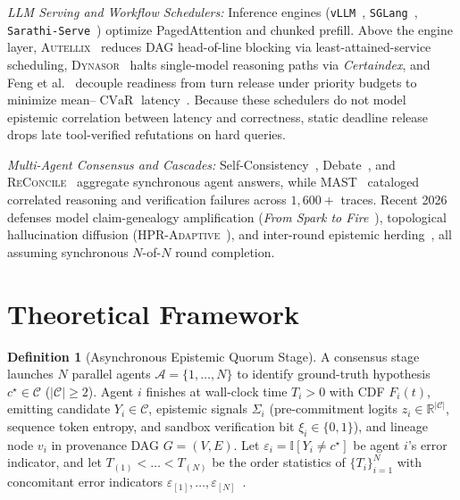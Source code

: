 \documentclass[conference]{IEEEtran}
\theoremstyle{definition}
\newtheorem{definition}{Definition}
\theoremstyle{remark}
\newcommand{\CVaR}{\operatorname{CVaR}}
\newcommand{\R}{\mathbb{R}}
\newcommand{\Ind}{\mathbb{I}}
\begin{document}
\emph{LLM Serving and Workflow Schedulers:} Inference engines (\texttt{vLLM}~\cite{kwon2023vllm}, \texttt{SGLang}~\cite{zheng2024sglang}, \texttt{Sarathi-Serve}~\cite{agrawal2024sarathi}) optimize PagedAttention and chunked prefill. Above the engine layer, \textsc{Autellix}~\cite{luo2025autellix} reduces DAG head-of-line blocking via least-attained-service scheduling, \textsc{Dynasor}~\cite{fu2024dynasor} halts single-model reasoning paths via \emph{Certaindex}, and Feng et al.~\cite{feng2026readiness} decouple readiness from turn release under priority budgets to minimize mean--$\CVaR$ latency~\cite{rockafellar2000cvar}. Because these schedulers do not model epistemic correlation between latency and correctness, static deadline release drops late tool-verified refutations on hard queries.

\emph{Multi-Agent Consensus and Cascades:} Self-Consistency~\cite{wang2023selfconsistency}, Debate~\cite{du2024debate,liang2024divergent}, and \textsc{ReConcile}~\cite{chen2024reconcile} aggregate synchronous agent answers, while \textsc{MAST}~\cite{cemri2025mast} cataloged correlated reasoning and verification failures across $1{,}600+$ traces. Recent 2026 defenses model claim-genealogy amplification (\emph{From Spark to Fire}~\cite{xie2026sparktofire}), topological hallucination diffusion (\textsc{HPR-Adaptive}~\cite{hpr2026collective}), and inter-round epistemic herding~\cite{herding2026cascades}, all assuming synchronous $N$-of-$N$ round completion.

\section{Theoretical Framework}\label{sec:theory}

\begin{definition}[Asynchronous Epistemic Quorum Stage]\label{def:stage}
A consensus stage launches $N$ parallel agents $\mathcal{A} = \{1, \dots, N\}$ to identify ground-truth hypothesis $c^\star \in \mathcal{C}$ ($|\mathcal{C}| \ge 2$). Agent $i$ finishes at wall-clock time $T_i > 0$ with CDF $F_i(t)$, emitting candidate $Y_i \in \mathcal{C}$, epistemic signals $\Sigma_i$ (pre-commitment logits $z_i \in \R^{|\mathcal{C}|}$, sequence token entropy, and sandbox verification bit $\xi_i \in \{0, 1\}$), and lineage node $v_i$ in provenance DAG $G = (V, E)$. Let $\varepsilon_i = \Ind[Y_i \neq c^\star]$ be agent $i$'s error indicator, and let $T_{(1)} < \dots < T_{(N)}$ be the order statistics of $\{T_i\}_{i=1}^N$ with concomitant error indicators $\varepsilon_{[1]}, \dots, \varepsilon_{[N]}$~\cite{david2003order}.
\end{definition}
\end{document}
